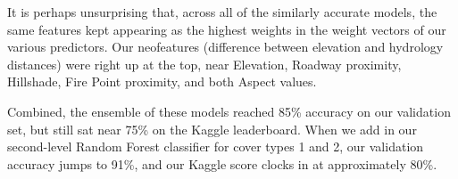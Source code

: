 It is perhaps unsurprising that, across all of the similarly accurate 
models, the same features kept appearing as the highest weights in the 
weight vectors of our various predictors.  Our neofeatures (difference 
between elevation and hydrology distances) were right up at the top, 
near Elevation, Roadway proximity, Hillshade, Fire Point proximity, and 
both Aspect values.

Combined, the ensemble of these models reached 85\% accuracy on our 
validation set, but still sat near 75\% on the Kaggle leaderboard.  
When we add in our second-level Random Forest classifier for cover 
types 1 and 2, our validation accuracy jumps to 91\%, and our Kaggle 
score clocks in at approximately 80\%.



